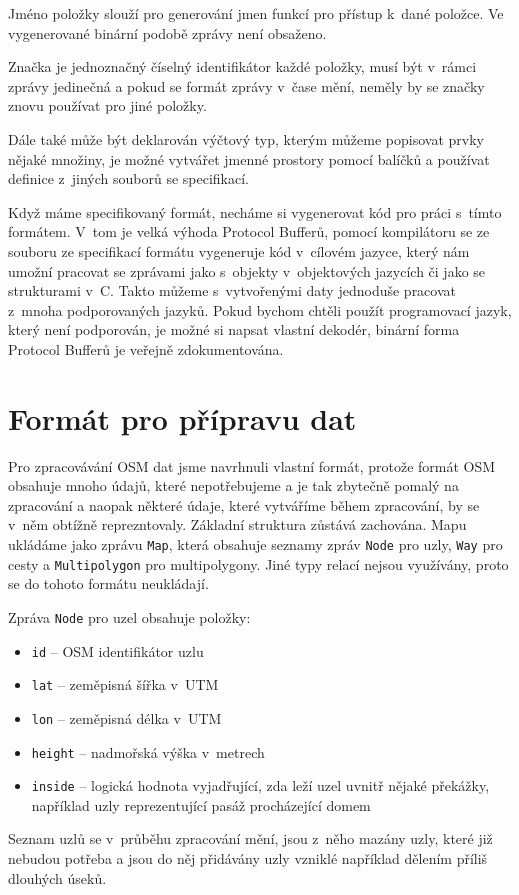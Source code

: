 {\tuc Jméno} položky slouží pro generování jmen funkcí pro přístup k~dané
položce. Ve vygenerované binární podobě zprávy není obsaženo. 

{\tuc Značka} je jednoznačný číselný identifikátor každé položky, musí být v~rámci
zprávy jedinečná a pokud se formát zprávy v~čase mění, neměly by se značky znovu
používat pro jiné položky.

Dále také může být deklarován výčtový typ, kterým můžeme popisovat prvky
nějaké množiny, je možné vytvářet jmenné prostory pomocí balíčků a používat
definice z~jiných souborů se specifikací.

Když máme specifikovaný formát, necháme si vygenerovat kód pro práci s~tímto
formátem. V~tom je velká výhoda Protocol Bufferů, pomocí kompilátoru se ze
souboru ze specifikací formátu vygeneruje kód v~cílovém jazyce, který nám umožní
pracovat se zprávami jako s~objekty v~objektových jazycích či jako se
strukturami v~C. Takto můžeme s~vytvořenými daty jednoduše pracovat z~mnoha
podporovaných jazyků. Pokud bychom chtěli použít programovací jazyk, který není
podporován, je možné si napsat vlastní dekodér, binární forma Protocol Bufferů
je veřejně zdokumentována.\cite{pbfenc}



\section{Formát pro přípravu dat}
Pro zpracovávání OSM dat jsme navrhnuli vlastní formát, protože formát OSM
obsahuje mnoho údajů, které nepotřebujeme a je tak zbytečně pomalý na zpracování
a naopak některé údaje, které vytváříme během zpracování, by se v~něm obtížně
reprezntovaly. Základní struktura zůstává zachována. Mapu ukládáme jako zprávu
\verb|Map|, která obsahuje seznamy zpráv \verb|Node| pro uzly, \verb|Way| pro
cesty a \verb|Multipolygon| pro multipolygony. Jiné typy relací nejsou
využívány, proto se do tohoto formátu neukládají.

Zpráva \verb|Node| pro uzel obsahuje položky:
\begin{itemize}
	\item \verb|id| -- OSM identifikátor uzlu
	\item \verb|lat| -- zeměpisná šířka v~UTM
	\item \verb|lon| -- zeměpisná délka v~UTM
	\item \verb|height| -- nadmořská výška v~metrech
	\item \verb|inside| -- logická hodnota vyjadřující, zda leží uzel uvnitř
	nějaké překážky, například uzly reprezentující pasáž procházející domem
\end{itemize}
Seznam uzlů se v~průběhu zpracování mění, jsou z~něho mazány uzly, které již
nebudou potřeba a jsou do něj přidávány uzly vzniklé například dělením příliš
dlouhých úseků.

